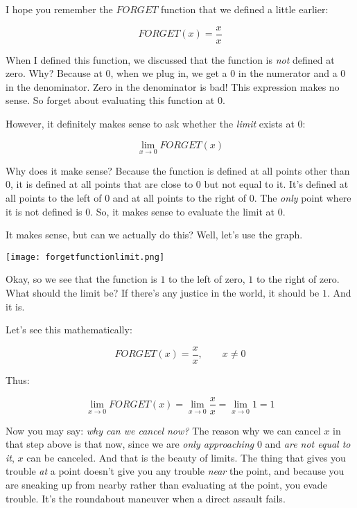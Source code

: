 \documentclass[10pt]{amsart}
\begin{document}
I hope you remember the $FORGET$ function that we defined a little earlier:

\begin{equation*}
  FORGET(x) = \frac{x}{x}
\end{equation*}

When I defined this function, we discussed that the function is {\em
not} defined at zero. Why? Because at $0$, when we plug in, we get a
$0$ in the numerator and a $0$ in the denominator. Zero in the
denominator is bad! This expression makes no sense. So forget about
evaluating this function at $0$.

However, it definitely makes sense to ask whether the {\em limit}
exists at $0$:

\begin{equation*}
  \lim_{x \to 0} FORGET(x)
\end{equation*}

Why does it make sense? Because the function is defined at all points
other than $0$, it is defined at all points that are close to $0$ but
not equal to it. It's defined at all points to the left of $0$ and at
all points to the right of $0$. The {\em only} point where it is not
defined is $0$. So, it makes sense to evaluate the limit at $0$.

It makes sense, but can we actually do this? Well, let's use the
graph.

\texttt{[image: forgetfunctionlimit.png]}

Okay, so we see that the function is $1$ to the
left of zero, $1$ to the right of zero. What should the limit be? If
there's any justice in the world, it should be $1$. And it is.

Let's see this mathematically:

\begin{equation*}
  FORGET(x) = \frac{x}{x}, \qquad x \ne 0
\end{equation*}

Thus:

\begin{equation*}
  \lim_{x \to 0} FORGET(x) = \lim_{x \to 0} \frac{x}{x} = \lim_{x \to 0} 1 = 1
\end{equation*}

Now you may say: {\em why can we cancel now?} The reason why we can
cancel $x$ in that step above is that now, since we are {\em only
approaching} $0$ and {\em are not equal to it}, $x$ can be
canceled. And that is the beauty of limits. The thing that gives you
trouble {\em at} a point doesn't give you any trouble {\em near} the
point, and because you are sneaking up from nearby rather than
evaluating at the point, you evade trouble. It's the roundabout
maneuver when a direct assault fails.
\end{document}
